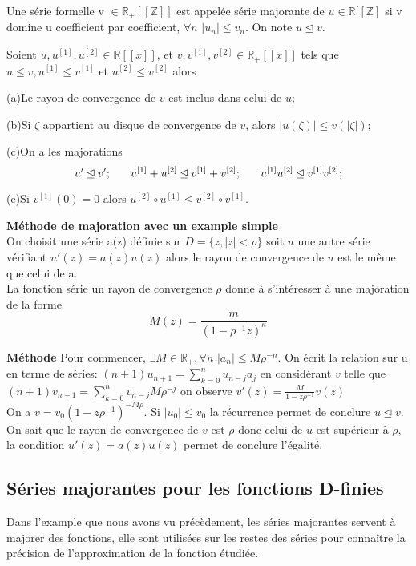 \documentclass[a4paper,10.5pt]{article}
\begin{document}
	\begin{definition} Une série formelle v $\in \mathbb{R}_{+}[[\mathbb{Z}]]$ est appelée série majorante de $ u \in \mathbb{R}[[\mathbb{Z}]$ si v domine u coefficient par coefficient, $\forall n$ $ |u_{n}|\leq v_{n}$. On note $u \unlhd v$.
	\end{definition}
	
	\begin{proposition} Soient $u,u^{[1]},u^{[2]}\in \mathbb{R}[[x]]$, et $v,v^{[1]},v^{[2]} \in \mathbb{R}_{+}[[x]]$ tels que $u\leq v,u^{[1]}\leq v^{[1]}$ et $u^{[2]}\leq v^{[2]}$ alors
		
		(a)Le rayon de convergence de $v$ est inclus dans celui de $u$;
		
		(b)Si $\zeta$ appartient au disque de convergence de $v$, alors $|u(\zeta)|\leq v(|\zeta|)$;
		
		(c)On a les majorations
		\[u' \unlhd v'; \hspace{6mm} u^{[1]}+u^{[2]}\unlhd v^{[1]}+v^{[2]}; \hspace{6mm}u^{[1]}u^{[2]}\unlhd v^{[1]}v^{[2]}; \]
		
		(e)Si $v^{[1]}(0)=0$ alors $ u^{[2]} \circ u^{[1]} \unlhd v^{[2]}\circ v^{[1]}$.
		
	\end{proposition}
	
	\noindent\textbf{Méthode de majoration avec un example simple}\\
	On choisit une série a(z) définie sur $D=\{z,|z|<\rho\}$ soit $u$ une autre série vérifiant $u'(z)=a(z)u(z)$ alors le rayon de convergence de $u$ est le même que celui de a.\\
	La fonction série un rayon de convergence $\rho$ donne à s'intéresser à une majoration de la forme
	\[M(z)=\frac{m}{(1-\rho^{-1} z)^{\kappa}}\] 
	
	\noindent\textbf{Méthode} Pour commencer, $\exists M \in \mathbb{R}_{+}, \forall n$ $|a_{n}|\leq M \rho^{-n}$.
	On écrit la relation sur u en terme de séries: $(n+1)u_{n+1}=\sum_{k=0}^{n}u_{n-j}a_{j}$ en considérant $v$ telle que  $(n+1)v_{n+1}=\sum_{k=0}^{n}v_{n-j}M\rho^{-j}$ on observe $v'(z)=\frac{M}{1-z\rho^{-1}}v(z)$ \\
	On a $v=v_{0}(1-z\rho^{-1})^{-M\rho}$. Si $|u_{0}| \leq v_{0}$ la récurrence permet de conclure $ u\unlhd v$. On sait que le rayon de convergence de $v$ est $\rho$ donc celui de $u$ est supérieur à $\rho$, la condition $u'(z)=a(z)u(z)$ permet de conclure l'égalité.
	
	\subsection{Séries majorantes pour les fonctions D-finies}
	Dans l'example que nous avons vu précèdement, les séries majorantes servent à majorer des fonctions, elle sont utilisées sur les restes des séries pour connaître la précision de l'approximation de la fonction étudiée.
	
\end{document}
